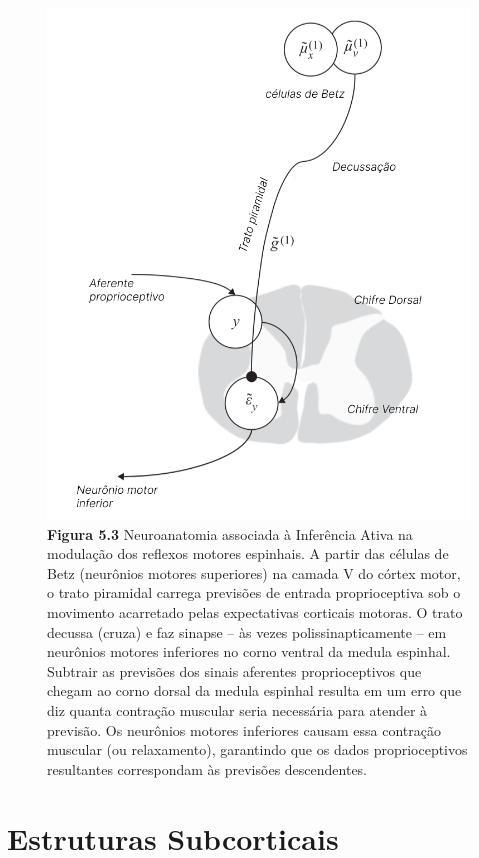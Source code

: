 \documentclass[
  12pt,
]{book}
\begin{document}
\begin{figure}
\centering
\includegraphics{images/Figura_5_3.png}
\caption{\textbf{Figura 5.3} Neuroanatomia associada à Inferência Ativa na modulação dos reflexos motores espinhais. A partir das células de Betz (neurônios motores superiores) na camada V do córtex motor, o trato piramidal carrega previsões de entrada proprioceptiva sob o movimento acarretado pelas expectativas corticais motoras. O trato decussa (cruza) e faz sinapse -- às vezes polissinapticamente -- em neurônios motores inferiores no corno ventral da medula espinhal. Subtrair as previsões dos sinais aferentes proprioceptivos que chegam ao corno dorsal da medula espinhal resulta em um erro que diz quanta contração muscular seria necessária para atender à previsão. Os neurônios motores inferiores causam essa contração muscular (ou relaxamento), garantindo que os dados proprioceptivos resultantes correspondam às previsões descendentes.}
\end{figure}

\hypertarget{estruturas-subcorticais}{%
\section{Estruturas Subcorticais}\label{estruturas-subcorticais}}
\end{document}
